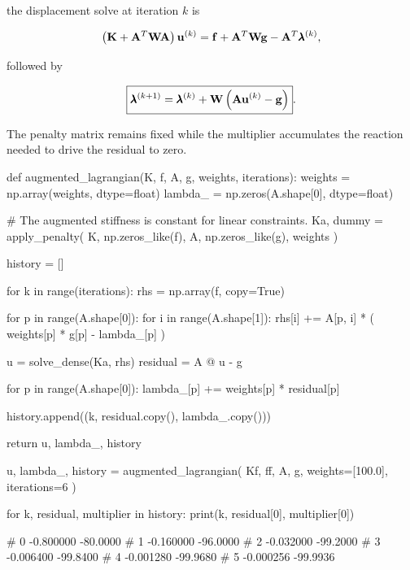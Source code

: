 the displacement solve at iteration $k$ is

\begin{equation}\label{mfc-lagrange-augmented-decomposed}
    \left(\mathbf{K}+\mathbf{A}^T\mathbf{W}\mathbf{A}\right)\mathbf{u}^{(k)}
    =\mathbf{f}+\mathbf{A}^T\mathbf{W}\mathbf{g}
    -\mathbf{A}^T\pmb{\lambda}^{(k)},
\end{equation}

followed by

\begin{equation}\label{mfc-lagrange-augmented-iteration}
    \boxed{
    \pmb{\lambda}^{(k+1)}
    =\pmb{\lambda}^{(k)}+
    \mathbf{W}\left(\mathbf{A}\mathbf{u}^{(k)}-\mathbf{g}\right)
    }.
\end{equation}

The penalty matrix remains fixed while the multiplier accumulates the reaction
needed to drive the residual to zero.

\begin{python}
def augmented_lagrangian(K, f, A, g, weights, iterations):
    weights = np.array(weights, dtype=float)
    lambda_ = np.zeros(A.shape[0], dtype=float)

    # The augmented stiffness is constant for linear constraints.
    Ka, dummy = apply_penalty(
        K, np.zeros_like(f), A, np.zeros_like(g), weights
    )

    history = []

    for k in range(iterations):
        rhs = np.array(f, copy=True)

        for p in range(A.shape[0]):
            for i in range(A.shape[1]):
                rhs[i] += A[p, i] * (
                    weights[p] * g[p] - lambda_[p]
                )

        u = solve_dense(Ka, rhs)
        residual = A @ u - g

        for p in range(A.shape[0]):
            lambda_[p] += weights[p] * residual[p]

        history.append((k, residual.copy(), lambda_.copy()))

    return u, lambda_, history


u, lambda_, history = augmented_lagrangian(
    Kf, ff, A, g, weights=[100.0], iterations=6
)

for k, residual, multiplier in history:
    print(k, residual[0], multiplier[0])

# 0  -0.800000  -80.0000
# 1  -0.160000  -96.0000
# 2  -0.032000  -99.2000
# 3  -0.006400  -99.8400
# 4  -0.001280  -99.9680
# 5  -0.000256  -99.9936
\end{python}

